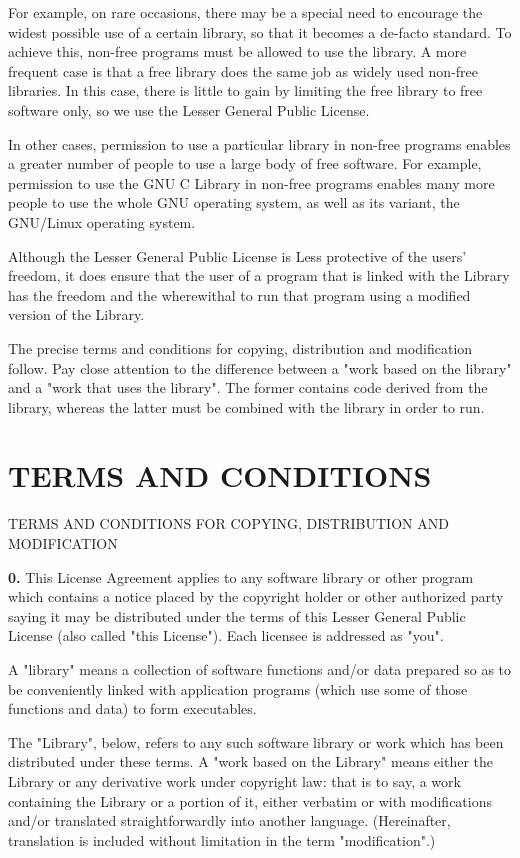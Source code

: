 For example, on rare occasions, there may be a special need to encourage the
widest possible use of a certain library, so that it becomes a de-facto
standard. To achieve this, non-free programs must be allowed to use the
library. A more frequent case is that a free library does the same job as
widely used non-free libraries. In this case, there is little to gain by
limiting the free library to free software only, so we use the Lesser General
Public License.

In other cases, permission to use a particular library in non-free programs
enables a greater number of people to use a large body of free software. For
example, permission to use the GNU C Library in non-free programs enables many
more people to use the whole GNU operating system, as well as its variant, the
GNU/Linux operating system.

Although the Lesser General Public License is Less protective of the users'
freedom, it does ensure that the user of a program that is linked with the
Library has the freedom and the wherewithal to run that program using a
modified version of the Library.

The precise terms and conditions for copying, distribution and modification
follow. Pay close attention to the difference between a "work based on the
library" and a "work that uses the library". The former contains code
derived from the library, whereas the latter must be combined with the library
in order to run.

\section{TERMS AND CONDITIONS}
\label{SEC34}

TERMS AND CONDITIONS FOR COPYING, DISTRIBUTION AND MODIFICATION

{\bf 0.} This License Agreement applies to any software library or other
program which contains a notice placed by the copyright holder or other
authorized party saying it may be distributed under the terms of this Lesser
General Public License (also called "this License"). Each licensee is
addressed as "you".

A "library" means a collection of software functions and/or data prepared so
as to be conveniently linked with application programs (which use some of
those functions and data) to form executables.

The "Library", below, refers to any such software library or work which has
been distributed under these terms. A "work based on the Library" means
either the Library or any derivative work under copyright law: that is to say,
a work containing the Library or a portion of it, either verbatim or with
modifications and/or translated straightforwardly into another language.
(Hereinafter, translation is included without limitation in the term
"modification".)

